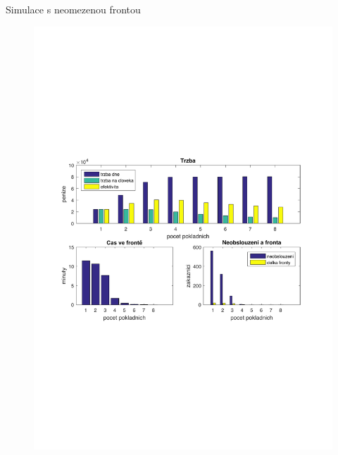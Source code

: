 \begin{frame}{Simulace s neomezenou frontou}
	\begin{figure}
	\includegraphics[width=0.99\columnwidth]{imgs/maxFronta.pdf}
	\end{figure}
\end{frame}
